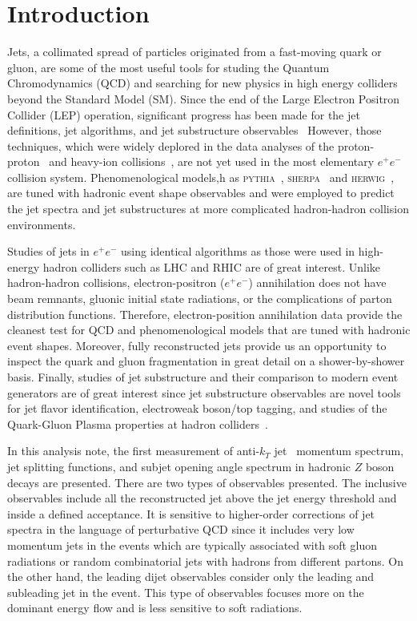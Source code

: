 
\section{Introduction}\label{Section:Introduction}


Jets, a collimated spread of particles originated from a fast-moving quark or gluon, are some of the most useful tools for studing the Quantum Chromodynamics (QCD) and searching for new physics in high energy colliders beyond the Standard Model (SM). Since the end of the Large Electron Positron Collider (LEP) operation, significant progress has been made for the jet definitions, jet algorithms, and jet substructure observables~\cite{Larkoski:2017jix} However, those techniques, which were widely deplored in the data analyses of the proton-proton~\cite{Kogler:2018hem} and heavy-ion collisions~\cite{Cao:2020wlm}, are not yet used in the most elementary $e^+e^-$ collision system. Phenomenological models,h as \textsc{pythia}~\cite{Sjostrand:2000wi}, \textsc{sherpa}~\cite{Gleisberg:2008ta} and \textsc{herwig}~\cite{Reichelt:2017hts}, are  tuned with hadronic event shape observables and were employed to predict the jet spectra and jet substructures at more complicated hadron-hadron collision environments.

Studies of jets in $e^+e^-$ using identical algorithms as those were used in high-energy hadron colliders such as LHC and RHIC are of great interest.
Unlike hadron-hadron collisions, electron-positron ($e^+e^-$) annihilation does not have beam remnants, gluonic initial state radiations, or the complications of parton distribution functions.
Therefore, electron-position annihilation data provide the cleanest test for QCD and phenomenological models that are tuned with hadronic event shapes.
Moreover, fully reconstructed jets provide us an opportunity to inspect the quark and gluon fragmentation in great detail on a shower-by-shower basis.
Finally, studies of jet substructure and their comparison to modern event generators are of great interest since jet substructure observables are novel tools for jet flavor identification, electroweak boson/top tagging, and studies of the Quark-Gluon Plasma properties at hadron colliders~\cite{Andrews:2018jcm}. 

In this analysis note, the first measurement of anti-$k_{T}$ jet~\cite{Cacciari:2008gp} momentum spectrum, jet splitting functions, and subjet opening angle spectrum in hadronic $Z$ boson decays are presented. There are two types of observables presented. The inclusive observables include all the reconstructed jet above the jet energy threshold and inside a defined acceptance. It is sensitive to higher-order corrections of jet spectra in the language of perturbative QCD since it includes very low momentum jets in the events which are typically associated with soft gluon radiations or random combinatorial jets with hadrons from different partons. On the other hand, the leading dijet observables consider only the leading and subleading jet in the event. This type of observables focuses more on the dominant energy flow and is less sensitive to soft radiations.

